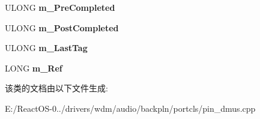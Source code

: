 \begin{DoxyCompactItemize}
U\+L\+O\+NG {\bfseries m\+\_\+\+Pre\+Completed}
\item 
\mbox{\label{class_c_port_pin_d_mus_aef693f8bc6b3c0189a40feb517597434}} 
U\+L\+O\+NG {\bfseries m\+\_\+\+Post\+Completed}
\item 
\mbox{\label{class_c_port_pin_d_mus_a5a77d35f0fd7f1ebaf221a7f7db20a90}} 
U\+L\+O\+NG {\bfseries m\+\_\+\+Last\+Tag}
\item 
\mbox{\label{class_c_port_pin_d_mus_a2d73082dec4a12df6a2d82b5b6f9f3bf}} 
L\+O\+NG {\bfseries m\+\_\+\+Ref}
\end{DoxyCompactItemize}


该类的文档由以下文件生成\+:\begin{DoxyCompactItemize}
\item 
E\+:/\+React\+O\+S-\/0../drivers/wdm/audio/backpln/portcls/pin\+\_\+dmus.\+cpp\end{DoxyCompactItemize}
